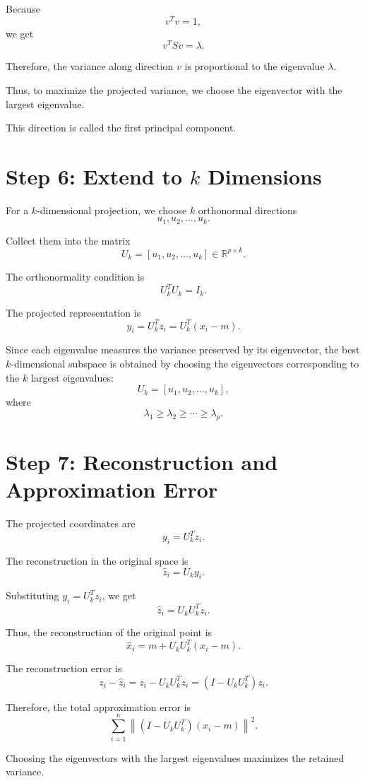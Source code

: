 \documentclass[11pt]{article}
\begin{document}
Because
\[
v^Tv=1,
\]
we get
\[
v^TSv=\lambda.
\]

Therefore, the variance along direction \(v\) is proportional to the eigenvalue \(\lambda\).

Thus, to maximize the projected variance, we choose the eigenvector with the largest eigenvalue.

This direction is called the first principal component.

\section*{Step 6: Extend to \(k\) Dimensions}

For a \(k\)-dimensional projection, we choose \(k\) orthonormal directions
\[
u_1,u_2,\dots,u_k.
\]

Collect them into the matrix
\[
U_k = [u_1,u_2,\dots,u_k]
\in \mathbb{R}^{p\times k}.
\]

The orthonormality condition is
\[
U_k^TU_k=I_k.
\]

The projected representation is
\[
y_i = U_k^Tz_i
=
U_k^T(x_i-m).
\]

Since each eigenvalue measures the variance preserved by its eigenvector, the best \(k\)-dimensional subspace is obtained by choosing the eigenvectors corresponding to the \(k\) largest eigenvalues:
\[
U_k = [u_1,u_2,\dots,u_k],
\]
where
\[
\lambda_1 \geq \lambda_2 \geq \cdots \geq \lambda_p.
\]

\section*{Step 7: Reconstruction and Approximation Error}

The projected coordinates are
\[
y_i = U_k^Tz_i.
\]

The reconstruction in the original space is
\[
\hat z_i = U_k y_i.
\]

Substituting \(y_i = U_k^Tz_i\), we get
\[
\hat z_i = U_kU_k^Tz_i.
\]

Thus, the reconstruction of the original point is
\[
\hat x_i = m + U_kU_k^T(x_i-m).
\]

The reconstruction error is
\[
z_i-\hat z_i
=
z_i-U_kU_k^Tz_i
=
(I-U_kU_k^T)z_i.
\]

Therefore, the total approximation error is
\[
\sum_{i=1}^n
\left\|
(I-U_kU_k^T)(x_i-m)
\right\|^2.
\]

Choosing the eigenvectors with the largest eigenvalues maximizes the retained variance.
\end{document}
